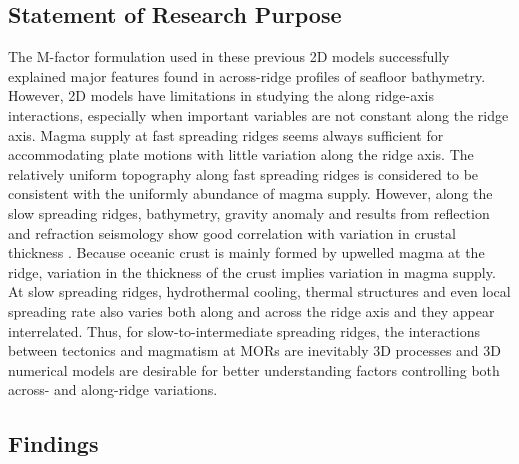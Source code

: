 \subsection{Statement of Research Purpose}
The M-factor formulation used in these previous 2D models successfully explained major features found in across-ridge profiles of seafloor bathymetry. However, 2D models have limitations in studying the along ridge-axis interactions, especially when important variables are not constant along the ridge axis. Magma supply at fast spreading ridges seems always sufficient for accommodating plate motions with little variation along the ridge axis. The relatively uniform topography along fast spreading ridges is considered to be consistent with the uniformly abundance of magma supply. However, along the slow spreading ridges, bathymetry, gravity anomaly and results from reflection and refraction seismology show good correlation with variation in crustal thickness \citep{Ryan2009, Chen1999, Lin1990, Tolstoy1993}. Because oceanic crust is mainly formed by upwelled magma at the ridge, variation in the thickness of the crust implies variation in magma supply. At slow spreading ridges, hydrothermal cooling, thermal structures and even local spreading rate \citep{Baines2008} also varies both along and across the ridge axis and they appear interrelated. Thus, for slow-to-intermediate spreading ridges, the interactions between tectonics and magmatism at MORs are inevitably 3D processes and 3D numerical models are desirable for better understanding factors controlling both across- and along-ridge variations. 

\subsection{Findings}


